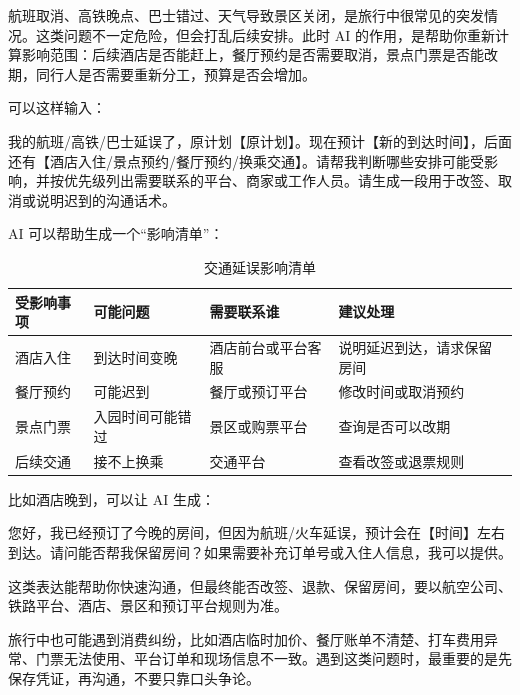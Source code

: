 
航班取消、高铁晚点、巴士错过、天气导致景区关闭，是旅行中很常见的突发情况。这类问题不一定危险，但会打乱后续安排。此时 AI 的作用，是帮助你重新计算影响范围：后续酒店是否能赶上，餐厅预约是否需要取消，景点门票是否能改期，同行人是否需要重新分工，预算是否会增加。

可以这样输入：

\begin{tcolorbox}[promptbox]
我的航班/高铁/巴士延误了，原计划【原计划】。现在预计【新的到达时间】，后面还有【酒店入住/景点预约/餐厅预约/换乘交通】。请帮我判断哪些安排可能受影响，并按优先级列出需要联系的平台、商家或工作人员。请生成一段用于改签、取消或说明迟到的沟通话术。
\end{tcolorbox}

AI 可以帮助生成一个“影响清单”：

\begin{table}[H]
\centering
\caption{交通延误影响清单}
\label{tab:traffic-delay-impact}
\begin{tabular}{p{}p{}p{}p{}}
\toprule
\textbf{受影响事项} & \textbf{可能问题} & \textbf{需要联系谁} & \textbf{建议处理} \\
\midrule
酒店入住 & 到达时间变晚 & 酒店前台或平台客服 & 说明延迟到达，请求保留房间 \\
餐厅预约 & 可能迟到 & 餐厅或预订平台 & 修改时间或取消预约 \\
景点门票 & 入园时间可能错过 & 景区或购票平台 & 查询是否可以改期 \\
后续交通 & 接不上换乘 & 交通平台 & 查看改签或退票规则 \\
\bottomrule
\end{tabular}
\end{table}
\FloatBarrier

比如酒店晚到，可以让 AI 生成：

\begin{tcolorbox}[promptbox]
您好，我已经预订了今晚的房间，但因为航班/火车延误，预计会在【时间】左右到达。请问能否帮我保留房间？如果需要补充订单号或入住人信息，我可以提供。
\end{tcolorbox}

这类表达能帮助你快速沟通，但最终能否改签、退款、保留房间，要以航空公司、铁路平台、酒店、景区和预订平台规则为准。


旅行中也可能遇到消费纠纷，比如酒店临时加价、餐厅账单不清楚、打车费用异常、门票无法使用、平台订单和现场信息不一致。遇到这类问题时，最重要的是先保存凭证，再沟通，不要只靠口头争论。

